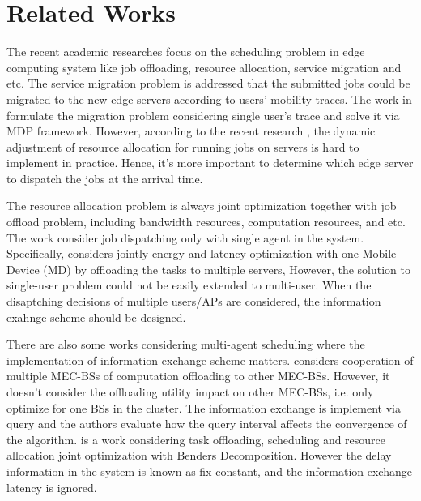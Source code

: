 \section{Related Works}
\label{sec:review}
The recent academic researches focus on the scheduling problem in edge computing system like job offloading, resource allocation, service migration and etc.
The service migration problem is addressed that the submitted jobs could be migrated to the new edge servers according to users' mobility traces.
The work in \cite{TON19-WangSq} formulate the migration problem considering single user's trace and solve it via MDP framework.
However, according to the recent research \cite{INFOCOM19-WuC}, the dynamic adjustment of resource allocation for running jobs on servers is hard to implement in practice.
Hence, it's more important to determine which edge server to dispatch the jobs at the arrival time.

The resource allocation problem is always joint optimization together with job offload problem, including bandwidth resources, computation resources, and etc.
The work \cite{TOC17-DinhTQ} consider job dispatching only with single agent in the system.
Specifically, \cite{TOC17-DinhTQ} considers jointly energy and latency optimization with one Mobile Device (MD) by offloading the tasks to multiple servers, 
However, the solution to single-user problem could not be easily extended to multi-user.
When the disaptching decisions of multiple users/APs are considered, the information exahnge scheme should be designed.

There are also some works considering multi-agent scheduling where the implementation of information exchange scheme matters.
\cite{Fan2017} considers cooperation of multiple MEC-BSs of computation offloading to other MEC-BSs. However, it doesn't consider the offloading utility impact on other MEC-BSs, i.e. only optimize for one BSs in the cluster.
The information exchange is implement via query and the authors evaluate how the query interval affects the convergence of the algorithm.
\cite{JSAC19-AlameddineHA} is a work considering task offloading, scheduling and resource allocation joint optimization with Benders Decomposition.
However the delay information in the system is known as fix constant, and the information exchange latency is ignored.

